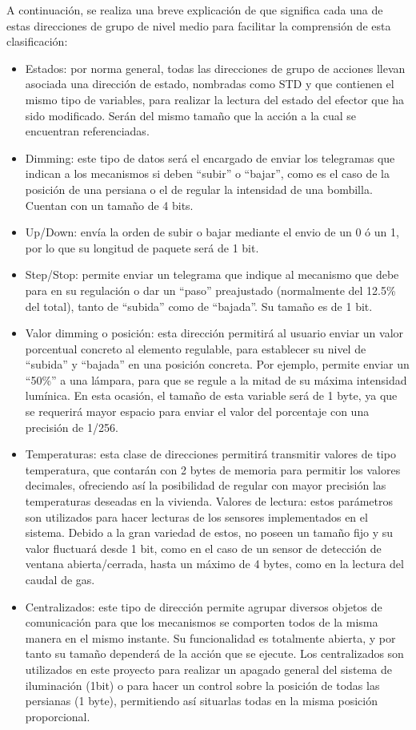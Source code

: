 A continuación, se realiza una breve explicación de que significa cada una de estas direcciones de grupo de nivel medio para facilitar la comprensión de esta clasificación:
\begin{itemize}
\item Estados: por norma general, todas las direcciones de grupo de acciones llevan asociada una dirección de estado, nombradas como STD y que contienen el mismo tipo de variables, para realizar la lectura del estado del efector que ha sido modificado. Serán del mismo tamaño que la acción a la cual se encuentran referenciadas.
\item Dimming: este tipo de datos será el encargado de enviar los telegramas que indican a los mecanismos si deben “subir” o “bajar”, como es el caso de la posición de una persiana o el de regular la intensidad de una bombilla. Cuentan con un tamaño de 4 bits.
\item Up/Down: envía la orden de subir o bajar mediante el envio de un 0 ó un 1, por lo que su longitud de paquete será de 1 bit.
\item Step/Stop: permite enviar un telegrama que indique al mecanismo que debe para en su regulación o dar un “paso” preajustado (normalmente del 12.5\% del total), tanto de “subida” como de “bajada”. Su tamaño es de 1 bit.
\item Valor dimming o posición: esta dirección permitirá al usuario enviar un valor porcentual concreto al elemento regulable, para establecer su nivel de “subida” y “bajada” en una posición concreta. Por ejemplo, permite enviar un “50\%” a una lámpara, para que se regule a la mitad de su máxima intensidad lumínica. En esta ocasión, el tamaño de esta variable será de 1 byte, ya que se requerirá mayor espacio para enviar el valor del porcentaje con una precisión de 1/256.
\item Temperaturas: esta clase de direcciones permitirá transmitir valores de tipo temperatura, que contarán con 2 bytes de memoria para permitir los valores decimales, ofreciendo así la posibilidad de regular con mayor precisión las temperaturas deseadas en la vivienda.
Valores de lectura: estos parámetros son utilizados para hacer lecturas de los sensores implementados en el sistema. Debido a la gran variedad de estos, no poseen un tamaño fijo y su valor fluctuará desde 1 bit, como en el caso de un sensor de detección de ventana abierta/cerrada, hasta un máximo de 4 bytes, como en la lectura del caudal de gas.
\item Centralizados: este tipo de dirección permite agrupar diversos objetos de comunicación para que los mecanismos se comporten todos de la misma manera en el mismo instante. Su funcionalidad es totalmente abierta, y por tanto su tamaño dependerá de la acción que se ejecute. Los centralizados son utilizados en este proyecto para realizar un apagado general del sistema de iluminación (1bit) o para hacer un control sobre la posición de todas las persianas (1 byte), permitiendo así situarlas todas en la misma posición proporcional.

\end{itemize}
